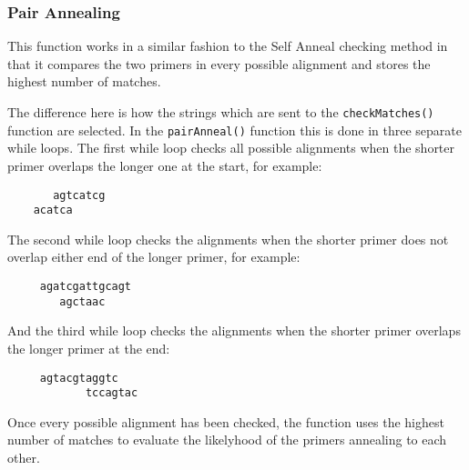 \subsubsection{Pair Annealing}

This function works in a similar fashion to the Self Anneal checking
method in that it compares the two primers in every possible alignment
and stores the highest number of matches.

The difference here is how the strings which are sent to the
\texttt{checkMatches()} function are selected. In the
\texttt{pairAnneal()} function this is done in three separate while
loops. The first while loop checks all possible alignments when the
shorter primer overlaps the longer one at the start, for example:
\begin{verbatim}
       agtcatcg
    acatca
\end{verbatim}
The second while loop checks the alignments when the shorter primer does
not overlap either end of the longer primer, for example:
\begin{verbatim}
     agatcgattgcagt
        agctaac
\end{verbatim}
And the third while loop checks the alignments when the shorter primer
overlaps the longer primer at the end:
\begin{verbatim}
     agtacgtaggtc
            tccagtac
\end{verbatim}
Once every possible alignment has been checked, the function uses the
highest number of matches to evaluate the likelyhood of the primers
annealing to each other.













